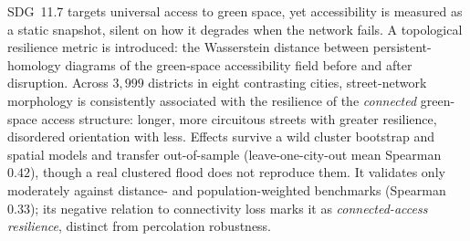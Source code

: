 SDG~11.7 targets universal access to green space, yet accessibility is measured as a
static snapshot, silent on how it degrades when the network fails. A topological
resilience metric is introduced: the Wasserstein distance between persistent-homology
diagrams of the green-space accessibility field before and after disruption. Across
$3{,}999$ districts in eight contrasting cities, street-network morphology is
consistently associated with the resilience of the \emph{connected} green-space access
structure: longer, more circuitous streets with greater resilience, disordered
orientation with less. Effects survive a wild cluster bootstrap and spatial models and
transfer out-of-sample (leave-one-city-out mean Spearman~$0.42$), though a real
clustered flood does not reproduce them. It validates only moderately against distance-
and population-weighted benchmarks (Spearman~$0.33$); its negative relation to
connectivity loss marks it as \emph{connected-access resilience}, distinct from
percolation robustness.
